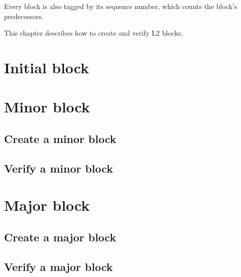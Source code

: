 \documentclass[../hydrozoa.tex]{subfiles}
\begin{document}
Every block is also tagged by its sequence number, which counts the block's predecessors.

This chapter describes how to create and verify L2 blocks.


\section{Initial block}%
\label{h:l2-initial-block}%


\section{Minor block}%
\label{h:l2-minor-block}%


\subsection{Create a minor block}%
\label{h:l2-minor-block-create}%


\subsection{Verify a minor block}%
\label{h:l2-minor-block-verify}%


\section{Major block}%
\label{h:l2-major-block}%


\subsection{Create a major block}%
\label{h:l2-major-block-create}%


\subsection{Verify a major block}%
\label{h:l2-major-block-verify}%


\end{document}
